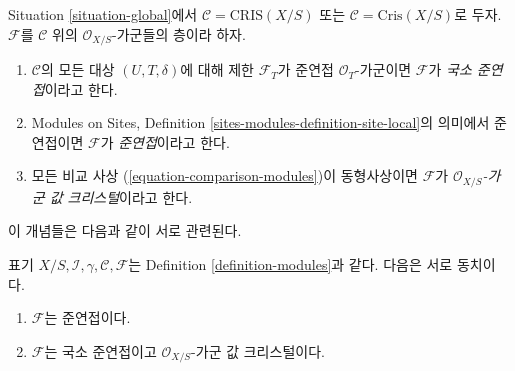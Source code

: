 \begin{definition}
\label{definition-modules}
Situation \ref{situation-global}에서
$\mathcal{C} = \text{CRIS}(X/S)$ 또는
$\mathcal{C} = \text{Cris}(X/S)$로 두자.
$\mathcal{F}$를 $\mathcal{C}$ 위의 $\mathcal{O}_{X/S}$-가군들의
층이라 하자.
\begin{enumerate}
\item $\mathcal{C}$의 모든 대상 $(U, T, \delta)$에 대해 제한
$\mathcal{F}_T$가 준연접 $\mathcal{O}_T$-가군이면
$\mathcal{F}$가 {\it 국소 준연접}이라고 한다.
\item Modules on Sites,
Definition \ref{sites-modules-definition-site-local}의 의미에서
준연접이면 $\mathcal{F}$가 {\it 준연접}이라고 한다.
\item 모든 비교 사상 (\ref{equation-comparison-modules})이
동형사상이면 $\mathcal{F}$가
{\it $\mathcal{O}_{X/S}$-가군 값 크리스털}이라고 한다.
\end{enumerate}
\end{definition}

\noindent
이 개념들은 다음과 같이 서로 관련된다.

\begin{lemma}
\label{lemma-crystal-quasi-coherent-modules}
표기 $X/S, \mathcal{I}, \gamma, \mathcal{C}, \mathcal{F}$는
Definition \ref{definition-modules}과 같다. 다음은 서로 동치이다.
\begin{enumerate}
\item $\mathcal{F}$는 준연접이다.
\item $\mathcal{F}$는 국소 준연접이고
$\mathcal{O}_{X/S}$-가군 값 크리스털이다.
\end{enumerate}
\end{lemma}


